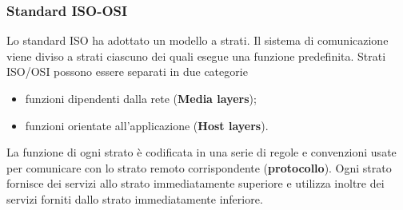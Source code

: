 \documentclass{article}
\begin{document}
\subsubsection{Standard ISO-OSI}
Lo standard ISO ha adottato un modello a strati. Il sistema di comunicazione viene diviso a strati ciascuno dei quali esegue una funzione predefinita.
Strati ISO/OSI possono essere separati in due categorie
\begin{itemize}
    \item funzioni dipendenti dalla rete (\textbf{Media layers});
    \item funzioni orientate all'applicazione (\textbf{Host layers}).
\end{itemize}
La funzione di ogni strato è codificata in una serie di regole e convenzioni usate per comunicare con lo strato remoto corrispondente (\textbf{protocollo}).
Ogni strato fornisce dei servizi allo strato immediatamente superiore e utilizza inoltre dei servizi forniti dallo strato immediatamente inferiore.
\end{document}
